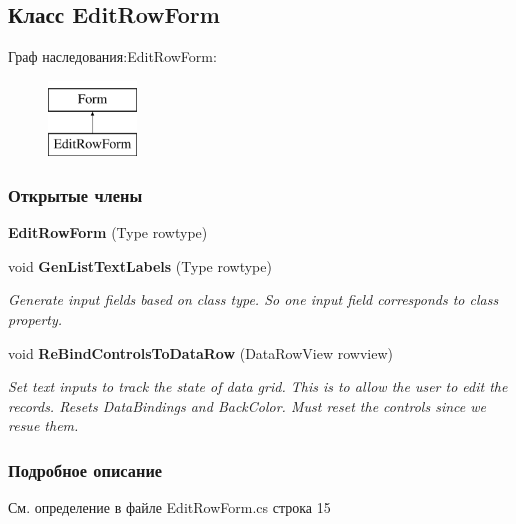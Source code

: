 \subsection{Класс Edit\+Row\+Form}
\label{classkdz__manager_1_1_edit_row_form}
Граф наследования\+:Edit\+Row\+Form\+:\begin{figure}[H]
\begin{center}
\leavevmode
\includegraphics[height=2.000000cm]{classkdz__manager_1_1_edit_row_form}
\end{center}
\end{figure}
\subsubsection*{Открытые члены}
\begin{DoxyCompactItemize}
\item 
{\bfseries Edit\+Row\+Form} (Type rowtype)\label{classkdz__manager_1_1_edit_row_form_a961ae1a89b9f867dba48c197f6ce0f48}

\item 
void {\bf Gen\+List\+Text\+Labels} (Type rowtype)
\begin{DoxyCompactList}\small\item\em Generate input fields based on class type. So one input field corresponds to class property. \end{DoxyCompactList}\item 
void {\bf Re\+Bind\+Controls\+To\+Data\+Row} (Data\+Row\+View rowview)
\begin{DoxyCompactList}\small\item\em Set text inputs to track the state of data grid. This is to allow the user to edit the records. Resets Data\+Bindings and Back\+Color. Must reset the controls since we resue them. \end{DoxyCompactList}\end{DoxyCompactItemize}


\subsubsection{Подробное описание}


См. определение в файле Edit\+Row\+Form.\+cs строка 15




